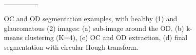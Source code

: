 \begin{figure}[h]
\begin{tabular}{c c c c c}
        {} & {} & {} & {} & {} \\

    \end{tabular}
    
    \caption{\label{segmentation_results}OC and OD segmentation examples, with healthy (1) and glaucomatous (2) images: (a) sub-image around the OD, (b) k-means clustering (K=4), (c) OC and OD extraction, (d) final segmentation with circular Hough transform.}
    
\end{figure}


